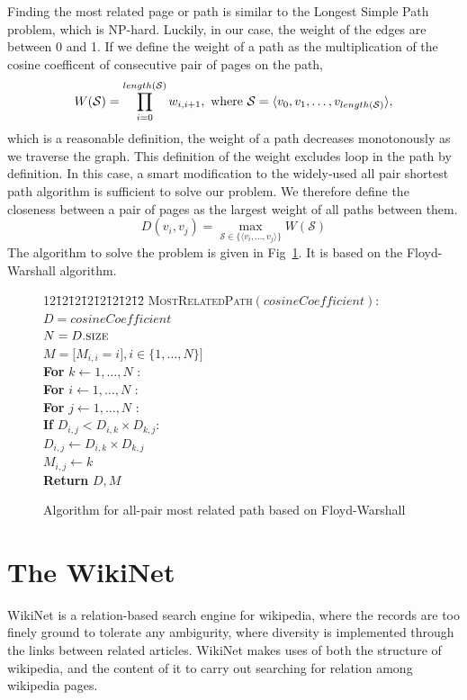 \documentclass[12pt]{amsart}
\newcommand{\0}{\mat{0}}
\newcommand{\1}{\mathds{1}}
\newenvironment{code}{\begin{tabbing}
    12\=12\=12\=12\=12\=12\=12\=12\= \kill }
  {\end{tabbing}}
\begin{document}
Finding the most related page or path is similar to the Longest Simple Path problem, which is NP-hard. Luckily, in our case, the weight of the edges are between 0 and 1. If we define the weight of a path as the  multiplication of the cosine coefficent of consecutive pair of pages on the path, 
\[
W(\mathcal{S}) = \prod_{i = 0}^{length(\mathcal{S})}w_{i, i+1}, \hbox{ where } \mathcal{S}=\langle v_0, v_1, \dots, v_{length(\mathcal{S})} \rangle, 
\]
which is a reasonable definition, the weight of a path decreases monotonously as we traverse the graph. This definition of the weight excludes loop in the path by definition. In this case, a smart modification to the widely-used all pair shortest path algorithm is sufficient to solve our problem. We therefore define the closeness between a pair of pages as the largest weight of all paths between them.
\[
D(v_i,v_j) = \max_{\mathcal{S} \in \{\langle v_i, \dots, v_j \rangle \}} W(\mathcal{S}) 
\]
The algorithm to solve the problem is given in Fig~\ref{al:dist}. It is based on the Floyd-Warshall algorithm. 
\begin{figure}
\begin{code}
\textsc{MostRelatedPath}$(cosineCoefficient)$: \\
\> $D = cosineCoefficient$ \\
\> $N=D.\textsc{size}$ \\
\> $M = \big[ M_{i,i} =i \big], i\in\{1,\dots,N\}]$ \\
\> \textbf{For} $ k \leftarrow 1,\dots, N$ : \\
\>\> \textbf{For} $ i \leftarrow 1,\dots, N$ : \\
\>\>\> \textbf{For} $ j \leftarrow 1,\dots, N$ : \\
\>\>\>\> \textbf{If} $D_{i,j} < D_{i,k} \times D_{k,j} $: \\
\>\>\>\>\> $D_{i,j} \leftarrow D_{i,k} \times D_{k,j}$ \\
\>\>\>\>\> $M_{i,j} \leftarrow k $ \\
\> \textbf{Return} $D,M$
\end{code}
\caption{Algorithm for all-pair most related path based on Floyd-Warshall}
\label{al:dist}
\end{figure}


\section{The WikiNet}
\label{sec:wikinet}
WikiNet is a relation-based search engine for wikipedia, where the records are too finely ground to tolerate any ambigurity, where diversity is implemented through the links between related articles. 
WikiNet makes uses of both the structure of wikipedia, and the content of it to carry out searching for relation among wikipedia pages. 
\end{document}
